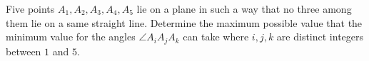 Five points $A_1,A_2,A_3,A_4,A_5$ lie on a plane in such a way that no three among them lie on a same straight line. Determine the maximum possible value that the minimum value for the angles $\angle A_iA_jA_k$ can take where $i, j, k$ are distinct integers between $1$ and $5$.